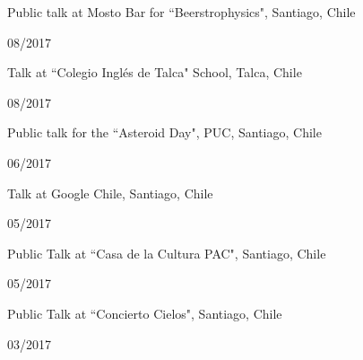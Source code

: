 \documentclass[12pt, a4paper]{article} %
\begin{document}
\begin{minipage}[t]{0.7\textwidth}
\begin{flushleft}%
  \setlength{\leftskip}{0.2cm}%
Public talk at Mosto Bar for ``Beerstrophysics", Santiago, Chile
\end{flushleft}
\end{minipage}
\begin{minipage}[t]{0.3\textwidth}
\hfill 08/2017
\end{minipage}

\begin{minipage}[t]{0.7\textwidth}
\begin{flushleft}%
  \setlength{\leftskip}{0.2cm}%
Talk at ``Colegio Ingl\'es de Talca" School, Talca, Chile
\end{flushleft}
\end{minipage}
\begin{minipage}[t]{0.3\textwidth}
\hfill 08/2017
\end{minipage}

\begin{minipage}[t]{0.7\textwidth}
\begin{flushleft}%
  \setlength{\leftskip}{0.2cm}%
Public talk for the ``Asteroid Day", PUC, Santiago, Chile
\end{flushleft}
\end{minipage}
\begin{minipage}[t]{0.3\textwidth}
\hfill 06/2017
\end{minipage}

\begin{minipage}[t]{0.7\textwidth}
\begin{flushleft}%
  \setlength{\leftskip}{0.2cm}%
Talk at Google Chile, Santiago, Chile
\end{flushleft}
\end{minipage}
\begin{minipage}[t]{0.3\textwidth}
\hfill 05/2017
\end{minipage}

\begin{minipage}[t]{0.7\textwidth}
\begin{flushleft}%
  \setlength{\leftskip}{0.2cm}%
Public Talk at ``Casa de la Cultura PAC", Santiago, Chile
\end{flushleft}
\end{minipage}
\begin{minipage}[t]{0.3\textwidth}
\hfill 05/2017
\end{minipage}

\begin{minipage}[t]{0.7\textwidth}
\begin{flushleft}%
  \setlength{\leftskip}{0.2cm}%
Public Talk at ``Concierto Cielos", Santiago, Chile
\end{flushleft}
\end{minipage}
\begin{minipage}[t]{0.3\textwidth}
\hfill 03/2017
\end{minipage}
\end{document}
